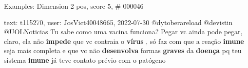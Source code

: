 \begin{frame}{Examples: Dimension 2 pos, score 5, \# 000046}
\footnotesize
\begin{exampleblock}{text: t115270, user: JosVict40048665, 2022-07-30}
@dytoberareload @devistin @UOLNoticias Tu sabe como uma vacina funciona? Pegar 
vc ainda pode pegar, claro, ela não \textbf{impede} que vc contraia o 
\textbf{vírus} , só faz com que a reação \textbf{imune} seja mais completa e 
que vc não \textbf{desenvolva} formas \textbf{graves} da \textbf{doença} pq teu 
sistema \textbf{imune} já teve contato prévio com o patógeno 
\end{exampleblock}
\end{frame}
